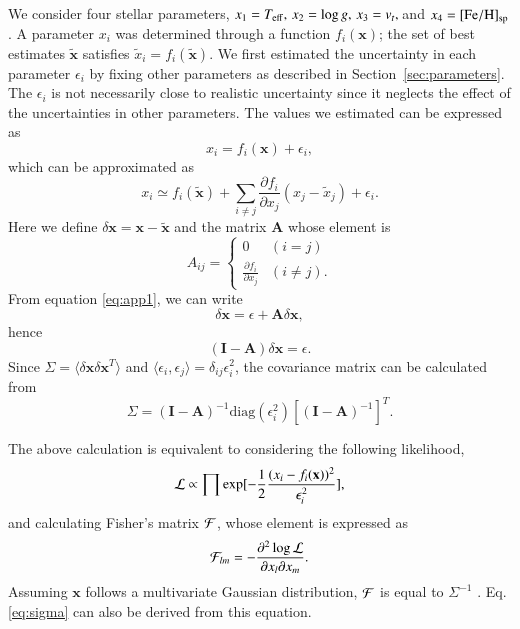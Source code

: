 \documentclass{aa}
\begin{document}
\begin{appendix}
We consider four stellar parameters, $x_1=T_{\rm eff},\,x_2=\log g,\,x_3=v_t,\,$and $x_4=[\mathrm{Fe/H}]_{\rm sp}$.
A parameter $x_i$ was determined through a function $f_i(\mathbf{x})$; the set of best estimates $\tilde{\mathbf{x}}$ satisfies $\tilde{x}_i=f_i(\tilde{\mathbf{x}})$.
We first estimated the uncertainty in each parameter $\epsilon_i$ by fixing other parameters as described in Section~\ref{sec:parameters}.
The $\epsilon_i$ is not necessarily close to realistic uncertainty since it neglects the effect of the uncertainties in other parameters.
The values we estimated can be expressed as
\begin{equation}
x_i = f_i(\textbf{x}) + \epsilon_i, \label{eq:app1}
\end{equation}
which can be approximated as
\begin{equation}
x_i \simeq f_i(\tilde{\mathbf{x}})+\sum_{i\neq j} \frac{\partial f_i}{\partial x_j}(x_j-\tilde{x}_{j})+\epsilon_i.
\end{equation}
Here we define $\delta \mathbf{x}=\mathbf{x}-\mathbf{\tilde{x}}$ and the matrix $\mathbf{A}$ whose element is 
\begin{equation}
A_{ij}=
\begin{cases}
0 & (i=j)\\
\frac{\partial f_i}{\partial x_j} &(i\neq j). 
\end{cases}
\end{equation}
From equation \ref{eq:app1}, we can write 
\begin{equation}
\delta\textbf{x}=\epsilon+\textbf{A}\delta\textbf{x},
\end{equation}
hence 
\begin{equation}
(\textbf{I}-\textbf{A})\delta\textbf{x}=\epsilon.
\end{equation}
Since $\Sigma = \langle\delta\textbf{x}\delta\textbf{x}^T\rangle$ and $\langle\epsilon_i,\epsilon_j\rangle=\delta_{ij}\epsilon_i^2$, the covariance matrix can be calculated from 
\begin{equation}
\Sigma=(\textbf{I}-\textbf{A})^{-1}\textrm{diag}(\epsilon_i^2)[(\textbf{I}-\textbf{A})^{-1}]^T. \label{eq:sigma}
\end{equation}

The above calculation is equivalent to considering the following likelihood,
\begin{equation}
{\cal L} \propto \prod \exp[-\frac{1}{2}\frac{(x_i-f_i(\mathbf{x}))^2}{\epsilon_i^2}],
\end{equation}
and calculating Fisher's matrix ${\cal F}$, whose element is expressed as 
\begin{equation}
{\cal F}_{lm} = -\frac{\partial^2 \log {\cal L}}{\partial x_l \partial x_m}.
\end{equation}
Assuming $\textbf{x}$ follows a multivariate Gaussian distribution, ${\cal F}$ is equal to $\Sigma^{-1}$ \citep[e.g.,][]{Andrae2010a}.
Eq. \ref{eq:sigma} can also be derived from this equation.


\end{appendix}
\end{document}
